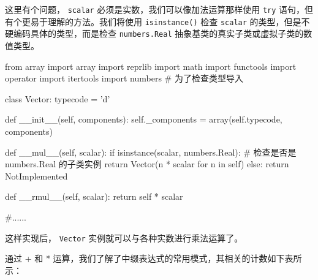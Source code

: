 这里有个问题， \texttt{scalar} 必须是实数，我们可以像加法运算那样使用 \texttt{try} 语句，但有个更易于理解的方法。我们将使用 \texttt{isinstance()} 检查 \texttt{scalar} 的类型，但是不硬编码具体的类型，而是检查 \texttt{numbers.Real} 抽象基类的真实子类或虚拟子类的数值类型。

\begin{python}
from array import array
import reprlib
import math
import functools
import operator
import itertools
import numbers      # 为了检查类型导入

class Vector:
    typecode = 'd'

    def __init__(self, components):
        self._components = array(self.typecode, components)

    def __mul__(self, scalar):
        if isinstance(scalar, numbers.Real):        # 检查是否是 numbers.Real 的子类实例
            return Vector(n * scalar for n in self)
        else:
            return NotImplemented

    def __rmul__(self, scalar):
        return self * scalar

    #......
\end{python}

这样实现后， \texttt{Vector} 实例就可以与各种实数进行乘法运算了。

通过 + 和 * 运算，我们了解了中缀表达式的常用模式，其相关的计数如下表所示：


